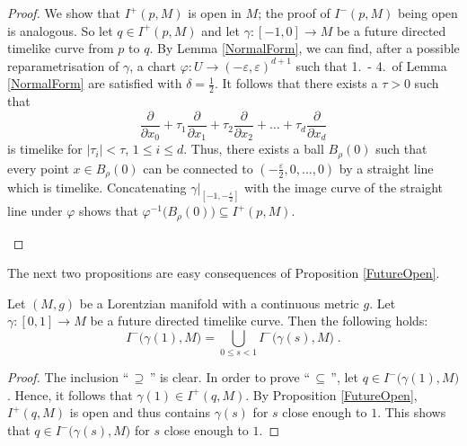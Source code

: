 \documentclass[reqno]{article}
\newcommand{\ed}{(-\varepsilon, \varepsilon)^{d+1}}
\begin{document}
\begin{proof}
We show that $I^+(p,M)$ is open in $M$; the proof of $I^-(p,M)$ being open is analogous. So let $q \in I^+(p,M)$ and let $\gamma : [-1, 0] \to M$ be a future directed timelike curve from $p$ to $q$. By Lemma \ref{NormalForm}, we can find, after a possible reparametrisation of $\gamma$, a chart $\varphi : U \to \ed$ such that 1.\ - 4.\ of Lemma \ref{NormalForm} are satisfied with $\delta = \frac{1}{2}$. It follows that there exists a $\tau >0$ such that 
\begin{equation*}
\frac{\partial}{\partial x_0} + \tau_1 \frac{\partial}{\partial x_1} + \tau_2 \frac{\partial}{\partial x_2} + \ldots + \tau_d \frac{\partial}{\partial x_d}
\end{equation*}
is timelike for $|\tau_i| < \tau$, $1 \leq i \leq d$. Thus, there exists a ball $B_\rho(0)$ such that every point $x \in B_\rho(0)$ can be connected to $(-\frac{\varepsilon}{2}, 0, \ldots, 0)$ by a straight line which is timelike. Concatenating $\gamma|_{[-1, -\frac{\varepsilon}{2}]}$ with the image curve of the straight line under $\varphi$ shows that $\varphi^{-1}\big(B_\rho(0)\big) \subseteq I^+(p,M)$.
\begin{center}
\def\svgwidth{7cm}

\end{center}
\end{proof}

The next two propositions are easy consequences of Proposition \ref{FutureOpen}.

\begin{proposition}\label{schwprop:UnionPasts}
\label{UnionPasts}
Let $(M,g)$ be a Lorentzian manifold with a continuous metric $g$. Let $\gamma : [0,1] \to M$ be a future directed timelike curve. Then the following holds:
\begin{equation*}
I^-\big(\gamma(1),M\big) = \bigcup_{0 \leq s <1} I^-\big(\gamma(s),M\big) \;.
\end{equation*}
\end{proposition}

\begin{proof}
The inclusion ``$\,\supseteq \,$'' is clear. In order to prove ``$\, \subseteq \,$'', let $q \in I^-\big(\gamma(1),M\big)$. Hence, it follows that $\gamma(1) \in I^+(q,M)$.  By Proposition \ref{FutureOpen}, $I^+(q,M)$ is open and thus contains $\gamma(s)$ for $s$ close enough to $1$. This shows that $q \in I^-\big(\gamma(s),M\big)$ for $s$ close enough to $1$.
\end{proof}
\end{document}
